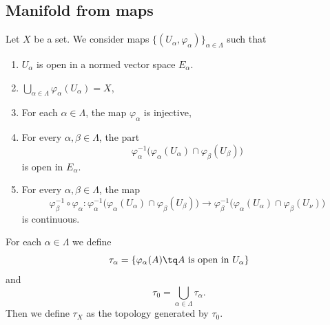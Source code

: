 \subsection{Manifold from maps}

\begin{theorem}		\label{THOooFIHIooLiSUxH}
	Let \( X\) be a set. We consider maps \( \{ (U_\alpha,\varphi_{\alpha}) \}_{\alpha\in\Lambda}\) such that
	\begin{enumerate}
		\item		\label{ITEMooDWSWooWdcDdI}
		      \( U_{\alpha}\) is open in a normed vector space \( E_{\alpha}\).
		\item		\label{ITEMooPEXDooNuJBKH}
		      \( \bigcup_{\alpha\in\Lambda}\varphi_{\alpha}(U_{\alpha})=X\),
		\item		\label{ITEMooSRPQooNUPzlj}
		      For each \( \alpha\in \Lambda\), the map \( \varphi_{\alpha}\) is injective,
		\item		\label{ITEMooWFAWooAqQfzZ}
		      For every \( \alpha,\beta\in\Lambda\), the part
		      \begin{equation}
			      \varphi_{\alpha}^{-1}\big( \varphi_{\alpha}(U_{\alpha})\cap \varphi_{\beta}(U_{\beta}) \big)
		      \end{equation}
		      is open in \( E_{\alpha}\).
		\item	\label{ITEMooZHLXooBpWSXr}
		      For every \( \alpha,\beta\in\Lambda\), the map
		      \begin{equation}
			      \varphi_{\beta}^{-1}\circ\varphi_{\alpha} \colon \varphi_{\alpha}^{-1}\big( \varphi_{\alpha}(U_{\alpha})\cap\varphi_{\beta}(U_{\beta}) \big)\to \varphi_{\beta}^{-1}\big( \varphi_{\alpha}(U_{\alpha})\cap\varphi_{\beta}(U_{\nu}) \big)
		      \end{equation}
		      is continuous.
	\end{enumerate}

	For each \( \alpha\in\Lambda\) we define
	\begin{equation}
		\tau_{\alpha}=\{ \varphi_{\alpha}(A)\tq \text{\( A\) is open in \( U_{\alpha}\)} \}
	\end{equation}
	and
	\begin{equation}		\label{EQooHMWQooUdceMk}
		\tau_{0}=\bigcup_{\alpha\in\Lambda}\tau_{\alpha}.
	\end{equation}
	Then we define \( \tau_X\) as the topology generated by \( \tau_0\).


\end{theorem}
